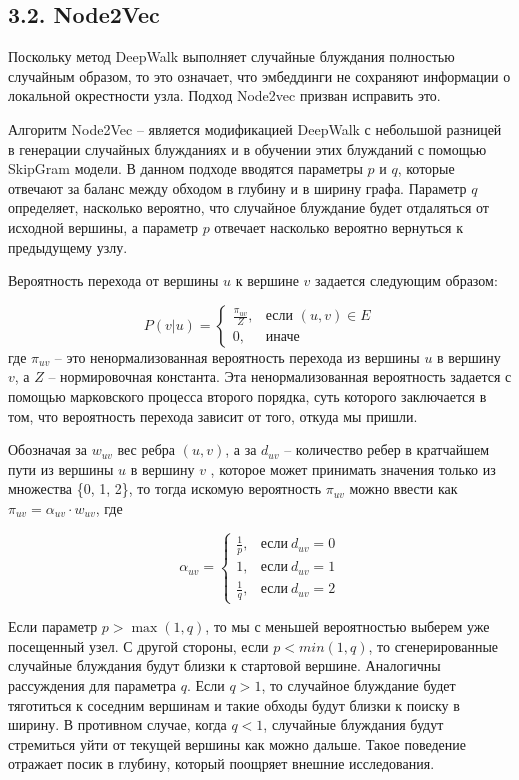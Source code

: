 \subsection{3.2. Node2Vec}

Поскольку метод DeepWalk выполняет случайные блуждания полностью случайным образом, то это означает, что эмбеддинги не сохраняют информации о локальной окрестности узла. Подход Node2vec \cite{Node2Vec}  призван исправить это.

Алгоритм Node2Vec -- является модификацией DeepWalk с небольшой разницей в генерации случайных блужданиях и в обучении этих блужданий с помощью SkipGram модели. В данном подходе вводятся параметры $p$ и $q$, которые отвечают за баланс между обходом в глубину и в ширину графа. Параметр $q$ определяет, насколько вероятно, что случайное блуждание будет отдаляться от исходной вершины, а параметр $p$ отвечает насколько вероятно вернуться к предыдущему узлу.

Вероятность перехода от вершины $u$ к вершине $v$ задается следующим образом: 

$$ P(v|u) =
\begin{cases}
\frac{\pi_{uv}}{Z}, & \text{если } (u, v) \in E \\
0, & \text{иначе}
\end{cases}
$$
где $\pi_{uv}$ -- это ненормализованная вероятность перехода из вершины $u$ в вершину $v$, а $Z$ -- нормировочная константа. Эта ненормализованная вероятность задается с помощью марковского процесса второго порядка, суть которого заключается в том, что вероятность перехода зависит от того, откуда мы пришли.

Обозначая за $w_{uv}$ вес ребра $(u, v)$, а за $d_{uv}$ -- количество ребер в кратчайшем пути из вершины $u$ в вершину $v$ , которое может принимать значения только из множества \{0, 1, 2\}, то тогда искомую вероятность $\pi_{uv}$ можно ввести как $\pi_{uv} = \alpha_{uv} \cdot w_{uv}$, где 

$$
\alpha_{uv} = 
\begin{cases}
\frac{1}{p}, & \text{если} \  d_{uv} = 0 \\
1, & \text{если}  \ d_{uv} = 1 \\
\frac{1}{q}, & \text{если} \ d_{uv} = 2
\end{cases}
$$

Если параметр $p > \max(1, q)$, то мы с меньшей вероятностью выберем уже посещенный узел. С другой стороны, если $p < min(1, q)$, то сгенерированные случайные блуждания будут близки к стартовой вершине. Аналогичны рассуждения для параметра $q$. Если $q > 1$, то случайное блуждание будет тяготиться к соседним вершинам и такие обходы будут близки к поиску в ширину. В противном случае, когда $q < 1$, случайные блуждания будут стремиться уйти от текущей вершины как можно дальше. Такое поведение отражает посик в глубину, который поощряет внешние исследования.

